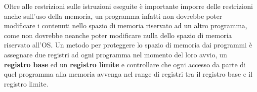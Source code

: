 \documentclass{article}
\begin{document}
        \begin{figure}[h]
            \centering
            \hfill
        \end{figure}
%
        Oltre alle restrizioni sulle istruzioni eseguite è importante imporre delle restrizioni anche sull'uso della memoria, un programma infatti non dovrebbe poter modificare i contenuti nello spazio di memoria riservato ad un altro programma, come non dovrebbe neanche poter modificare nulla dello spazio di memoria riservato all'OS.
        Un metodo per proteggere lo spazio di memoria dai programmi è assegnare due registri ad ogni programma nel momento del loro avvio, un \textbf{registro base} ed un \textbf{registro limite} e controllare che ogni accesso da parte di quel programma alla memoria avvenga nel range di registri tra il registro base e il registro limite.
\end{document}

